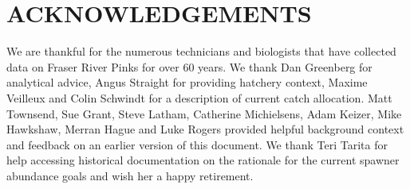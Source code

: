\documentclass[french,11pt]{book}
\begin{document}
\hypertarget{acknowledgements}{%
\section{ACKNOWLEDGEMENTS}\label{acknowledgements}}

We are thankful for the numerous technicians and biologists that have collected data on Fraser River Pinks for over 60 years. We thank Dan Greenberg for analytical advice, Angus Straight for providing hatchery context, Maxime Veilleux and Colin Schwindt for a description of current catch allocation. Matt Townsend, Sue Grant, Steve Latham, Catherine Michielsens, Adam Keizer, Mike Hawkshaw, Merran Hague and Luke Rogers provided helpful background context and feedback on an earlier version of this document. We thank Teri Tarita for help accessing historical documentation on the rationale for the current spawner abundance goals and wish her a happy retirement.
\end{document}
